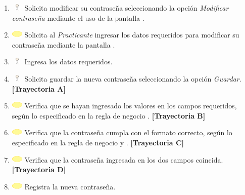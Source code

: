 \begin{enumerate}
	\item \includegraphics[width=15pt, height=10pt]{./Figuras/iconosCU/usuario.png} Solicita modificar su contraseña seleccionando la opción \textit{Modificar contraseña} mediante el uso de la pantalla . 
	\item \includegraphics[width=15pt]{./Figuras/iconosCU/herramienta.png} Solicita al \textit{Practicante} ingresar los datos requeridos para modificar su contraseña mediante la pantalla .
	\item \includegraphics[width=15pt, height=10pt]{./Figuras/iconosCU/usuario.png} Ingresa los datos requeridos.
	\item \includegraphics[width=15pt, height=10pt]{./Figuras/iconosCU/usuario.png} Solicita guardar la nueva contraseña seleccionando la opción \textit{Guardar}. \textbf{[Trayectoria A]}
	\item \includegraphics[width=15pt]{./Figuras/iconosCU/herramienta.png} Verifica que se hayan ingresado los valores en los campos requeridos, según lo especificado en la regla de negocio . \textbf{[Trayectoria B]}
	\item \includegraphics[width=15pt]{./Figuras/iconosCU/herramienta.png} Verifica que la contraseña cumpla con el formato correcto, según lo especificado en la regla de negocio  y . \textbf{[Trayectoria C]}
	\item \includegraphics[width=15pt]{./Figuras/iconosCU/herramienta.png} Verifica que la contraseña ingresada en los dos campos coincida. \textbf{[Trayectoria D]}
	\item \includegraphics[width=15pt]{./Figuras/iconosCU/herramienta.png} Registra la nueva contraseña.

\end{enumerate}
